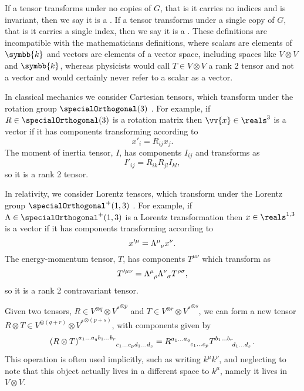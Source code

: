 \documentclass[fleqn]{NotesClass}
\renewcommand{\field}{\symbb{k}}
\newcommand{\dual}[1]{{#1^{*}}}
\newcommand{\lorentzGroup}{\specialOrthogonal^+(1, 3)}
\newcommand{\minkowskiSpace}{\reals^{1,3}}
\begin{document}
    If a tensor transforms under no copies of \(G\), that is it carries no indices and is invariant, then we say it is a .
    If a tensor transforms under a single copy of \(G\), that is it carries a single index, then we say it is a .
    These definitions are incompatible with the mathematicians definitions, where scalars are elements of \(\field\) and vectors are elements of a vector space, including spaces like \(V \otimes V\) and \(\field\), whereas physicists would call \(T \in V \otimes V\) a rank 2 tensor and not a vector and would certainly never refer to a scalar as a vector.
    
    \begin{exm}{}{}
        In classical mechanics we consider Cartesian tensors, which transform under the rotation group \(\specialOrthogonal(3)\) \cite[188]{goldstein}.
        For example, if \(R \in \specialOrthogonal(3)\) is a rotation matrix then \(\vv{x} \in \reals^3\) is a vector if it has components transforming according to
        \begin{equation}
            x'_i = R_{ij}x_j.
        \end{equation}
        The moment of inertia tensor, \(I\), has components \(I_{ij}\) and transforms as
        \begin{equation}
            I'_{ij} = R_{ik}R_{jl}I_{kl},
        \end{equation}
        so it is a rank 2 tensor.
        
        In relativity, we consider Lorentz tensors, which transform under the Lorentz group \(\lorentzGroup\) \cite[36]{weinberg}.
        For example, if \(\Lambda \in \lorentzGroup\) is a Lorentz transformation then \(x \in \minkowskiSpace\) is a vector if it has components transforming according to
        \begin{equation}
            x'^\mu = \tensor{\Lambda}{^\mu_\nu}x^\nu.
        \end{equation}
        The energy-momentum tensor, \(T\), has components \(T^{\mu\nu}\) which transform as
        \begin{equation}
            T'^{\mu\nu} = \tensor{\Lambda}{^\mu_\rho}\tensor{\Lambda}{^\nu_\sigma} T^{\rho\sigma},
        \end{equation}
        so it is a rank 2 contravariant tensor.
    \end{exm}
    
    Given two tensors, \(R \in V^{\otimes q} \otimes \dual{V}^{\otimes p}\) and \(T \in V^{\otimes r} \otimes \dual{V}^{\otimes s}\), we can form a new tensor \(R \otimes T \in V^{\otimes(q + r)} \otimes \dual{V}^{\otimes(p + s)}\), with components given by \cite[37]{weinberg}
    \begin{equation}
        \tensor{(R \otimes T)}{^{a_1\dotso a_q b_1 \dotso b_r}_{c_1 \dotso c_p d_1 \dotso d_s}} = \tensor{R}{^{a_1\dotso a_q}_{c_1 \dotso c_p}} \tensor{T}{^{b_1 \dotso b_r}_{d_1 \dotso d_s}}.
    \end{equation}
    This operation is often used implicitly, such as writing \(k^\mu k^\nu\), and neglecting to note that this object actually lives in a different space to \(k^\mu\), namely it lives in \(V \otimes V\).
    
\end{document}
